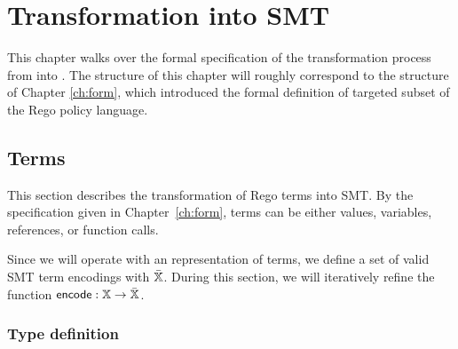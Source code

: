 \chapter{Transformation into SMT}
\label{ch:trans}

This chapter walks over the formal specification of the transformation process from \rego into \smtlib.
The structure of this chapter will roughly correspond to the structure of Chapter \ref{ch:form}, which introduced the formal definition of targeted subset of the Rego policy language.

\section{Terms}

%
%

This section describes the transformation of Rego terms into SMT.
By the specification given in Chapter~\ref{ch:form}, terms can be either values, variables, references, or function calls.

Since we will operate with an \smtlib representation of terms, we define a set of valid SMT term encodings with $\bar{\mathbb{X}}$.
During this section, we will iteratively refine the function $\mathsf{encode}: \mathbb{X} \to \bar{\mathbb{X}}$.

\subsection{Type definition}

